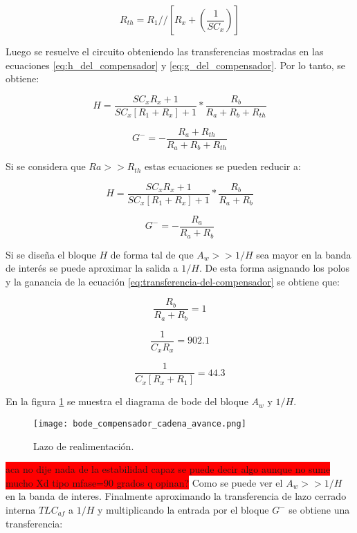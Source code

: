 \begin{equation} 
	R_{th} = R_1 //[R_x+(\frac{1}{SC_x})]
\end{equation}

Luego se resuelve el circuito obteniendo las transferencias mostradas en las ecuaciones \ref{eq:h_del_compensador} y \ref{eq:g_del_compensador}. Por lo tanto, se obtiene:

\begin{equation} 
	H = \frac{SC_xR_x+1}{SC_x[R_1+R_x]+1} * \frac{R_b}{R_a + R_b + R_{th}}
\end{equation}

\begin{equation} 
	G^- = - \frac{R_a + R_{th}}{R_a + R_b + R_{th}}
\end{equation}

Si se considera que $Ra>>R_{th}$ estas ecuaciones se pueden reducir a: 

\begin{equation} 
	H = \frac{SC_xR_x+1}{SC_x[R_1+R_x]+1} * \frac{R_b}{R_a + R_b}
\end{equation}

\begin{equation} 
	G^- =- \frac{R_a}{R_a + R_b}
\end{equation} 
  
Si se diseña el bloque $H$ de forma tal de que $A_w>>1/H$ sea mayor en la banda de interés se puede aproximar la salida a $1/H$. De esta forma  asignando los polos y la ganancia de la ecuación \ref{eq:transferencia-del-compensador} se obtiene que:

\begin{equation} 
	\frac{R_b}{R_a+R_b}= 1 
\end{equation}

\begin{equation} 
	\frac{1}{C_x R_x} =  902.1
\end{equation} 

\begin{equation} 
	\frac{1}{C_x [R_x + R_1]} = 44.3
\end{equation} 

En la figura \ref{fig:bode_compensador_cadena_avance} se muestra el diagrama de bode del bloque $A_w$ y $1/H$.
 
\begin{figure}[H]
	\centering
	\texttt{[image: bode\_compensador\_cadena\_avance.png]}
	\caption{Lazo de realimentación.}
	\label{fig:bode_compensador_cadena_avance}
\end{figure}
\colorbox{red}{aca no dije nada de la estabilidad capaz se puede decir algo aunque no sume mucho Xd tipo mfase=90 grados q opinan?}
Como se puede ver el $A_w >> 1/H$ en la banda de interes. Finalmente aproximando la transferencia de lazo cerrado interna $TLC_{af}$ a $1/H$ y multiplicando la entrada por el bloque $G^-$ se obtiene una transferencia:

